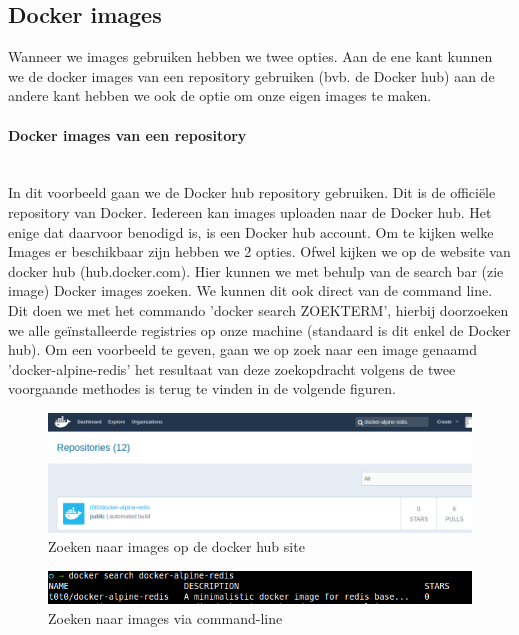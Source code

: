 
\subsection{Docker images}

Wanneer we images gebruiken hebben we twee opties. Aan de ene kant kunnen we de docker images van een repository gebruiken (bvb. de Docker hub) aan de andere kant hebben we ook de optie om onze eigen images te maken. 

\paragraph{Docker images van een repository}~\\

In dit voorbeeld gaan we de Docker hub repository gebruiken. Dit is de officiële repository van Docker. Iedereen kan images uploaden naar de Docker hub. Het enige dat daarvoor benodigd is, is een Docker hub account. Om te kijken welke Images er beschikbaar zijn hebben we 2 opties. Ofwel kijken we op de website van docker hub (hub.docker.com). Hier kunnen we met behulp van de search bar (zie image) Docker images zoeken. We kunnen dit ook direct van de command line. Dit doen we met het commando 'docker search ZOEKTERM', hierbij doorzoeken we alle geïnstalleerde registries op onze machine (standaard is dit enkel de Docker hub). Om een voorbeeld te geven, gaan we op zoek naar een image genaamd 'docker-alpine-redis' het resultaat van deze zoekopdracht volgens de twee voorgaande methodes is terug te vinden in de volgende figuren.
\begin{figure}[!ht]
	\centering
	\includegraphics[scale=0.315]{img/dockerSearchSite.png}
	\caption{Zoeken naar images op de docker hub site}
\end{figure}

\begin{figure}[!ht]
	\centering
	\includegraphics[scale=0.55]{img/dockerSearchCommand.png}
	\caption{Zoeken naar images via command-line}
\end{figure}	




